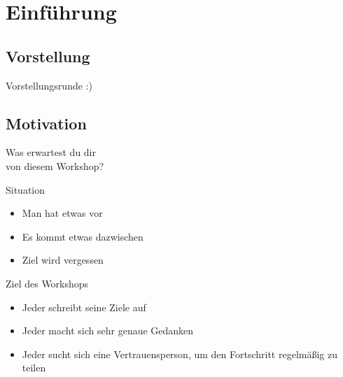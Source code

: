 \section{Einführung}

\subsection{Vorstellung}

\begin{frame}[standout]
    Vorstellungsrunde :)
\end{frame}


\subsection{Motivation}


\addtocounter{framenumber}{1}
\begin{frame}[standout]
    \LARGE
    Was erwartest du dir \\
    von diesem Workshop?
\end{frame}


\begin{frame}[c]{Situation}
    \Large
    \begin{itemize}[<+(1)->]
        \item Man hat etwas vor
        \item Es kommt etwas dazwischen
        \item Ziel wird vergessen
    \end{itemize}
\end{frame}

\begin{frame}[c]{Ziel des Workshops}
    \Large
    \begin{itemize}[<+(1)->]
        \item Jeder schreibt seine Ziele auf
        \item Jeder macht sich sehr genaue Gedanken
        \item Jeder sucht sich eine Vertrauensperson, um den Fortschritt regelmäßig zu teilen
    \end{itemize}
\end{frame}



